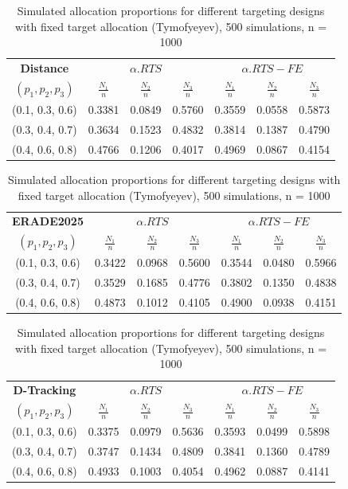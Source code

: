 \documentclass[11pt]{article}
\theoremstyle{plain}
\theoremstyle{definition}
\begin{document}
\begin{table}[tb]
	\centering
	\small
	\begin{tabular}{c|ccc|ccc}
		\hline
		\textbf{Distance} & \multicolumn{3}{c|}{\(\alpha.RTS\)} & \multicolumn{3}{c}{\(\alpha.RTS-FE\)} \\
		$(p_1, p_2, p_3)$
		& $\frac{N_1}{n}$ & $\frac{N_2}{n}$ & $\frac{N_3}{n}$
		& $\frac{N_1}{n}$ & $\frac{N_2}{n}$ & $\frac{N_3}{n}$ \\
		\hline
		(0.1, 0.3, 0.6) & 0.3381 & 0.0849 & 0.5760 & 0.3559 & 0.0558 & 0.5873 \\
		(0.3, 0.4, 0.7) & 0.3634 & 0.1523 & 0.4832 & 0.3814 & 0.1387 & 0.4790 \\
		(0.4, 0.6, 0.8) & 0.4766 & 0.1206 & 0.4017 & 0.4969 & 0.0867 & 0.4154 \\
		\hline
	\end{tabular}
	
\vspace{0.4cm}

	\begin{tabular}{c|ccc|ccc}
		\hline
		\textbf{ERADE2025} & \multicolumn{3}{c|}{\(\alpha.RTS\)} & \multicolumn{3}{c}{\(\alpha.RTS-FE\)} \\
		$(p_1, p_2, p_3)$
		& $\frac{N_1}{n}$ & $\frac{N_2}{n}$ & $\frac{N_3}{n}$
		& $\frac{N_1}{n}$ & $\frac{N_2}{n}$ & $\frac{N_3}{n}$ \\
		\hline
		(0.1, 0.3, 0.6) & 0.3422 & 0.0968 & 0.5600 & 0.3544 & 0.0480 & 0.5966 \\
		(0.3, 0.4, 0.7) & 0.3529 & 0.1685 & 0.4776 & 0.3802 & 0.1350 & 0.4838 \\
		(0.4, 0.6, 0.8) & 0.4873 & 0.1012 & 0.4105 & 0.4900 & 0.0938 & 0.4151 \\
		\hline
	\end{tabular}
	
\vspace{0.4cm}

	\begin{tabular}{c|ccc|ccc}
		\hline
		\textbf{D-Tracking} & \multicolumn{3}{c|}{\(\alpha.RTS\)} & \multicolumn{3}{c}{\(\alpha.RTS-FE\)} \\
		$(p_1, p_2, p_3)$
		& $\frac{N_1}{n}$ & $\frac{N_2}{n}$ & $\frac{N_3}{n}$
		& $\frac{N_1}{n}$ & $\frac{N_2}{n}$ & $\frac{N_3}{n}$ \\
		\hline
		(0.1, 0.3, 0.6) & 0.3375 & 0.0979 & 0.5636 & 0.3593 & 0.0499 & 0.5898 \\
		(0.3, 0.4, 0.7) & 0.3747 & 0.1434 & 0.4809 & 0.3841 & 0.1360 & 0.4789 \\
		(0.4, 0.6, 0.8) & 0.4933 & 0.1003 & 0.4054 & 0.4962 & 0.0887 & 0.4141 \\
		\hline
	\end{tabular}
	
\vspace{0.4cm}

	\caption{Simulated allocation proportions for different targeting designs with fixed target allocation (Tymofyeyev), 500 simulations, n = 1000}
	\label{tab:sparse-target}
\end{table}
\end{document}
